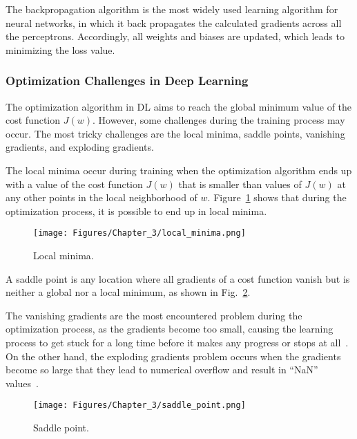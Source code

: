The backpropagation algorithm is the most widely used learning algorithm for neural networks, in which it back propagates the calculated gradients across all the perceptrons.
Accordingly, all weights and biases are updated, which leads to minimizing the loss value.
\subsubsection{Optimization Challenges in Deep Learning}
The optimization algorithm in DL aims to reach the global minimum value of the cost function \(J(w)\).
However, some challenges during the training process may occur.
The most tricky challenges are the local minima, saddle points, vanishing gradients, and exploding gradients.

The local minima occur during training when the optimization algorithm ends up with a value of the cost function \(J(w)\) that is smaller than values of \(J(w)\) at any other points in the local neighborhood of \(w\).
Figure~\ref{fig:local_minima} shows that during the optimization process, it is possible to end up in local minima.
\begin{figure}[!ht]
	\begin{center}
		\centering
		\texttt{[image: Figures/Chapter\_3/local\_minima.png]}
	\end{center}
	\caption{Local minima.} 
	\label{fig:local_minima}
\end{figure}

A saddle point is any location where all gradients of a cost function vanish but is neither a global nor a local minimum, as shown in Fig.~\ref{fig:saddle_point}.

The vanishing gradients are the most encountered problem during the optimization process, as the gradients become too small, causing the learning process to get stuck for a long time before it makes any progress or stops at all~\cite{Brownlee2017a}.
On the other hand, the exploding gradients problem occurs when the gradients become so large that they lead to numerical overflow and result in \enquote{NaN} values~\cite{Brownlee2017a}.
\begin{figure}[!ht]
	\begin{center}
		\centering
		\texttt{[image: Figures/Chapter\_3/saddle\_point.png]}
	\end{center}
	\caption{Saddle point.} 
	\label{fig:saddle_point}
\end{figure}
